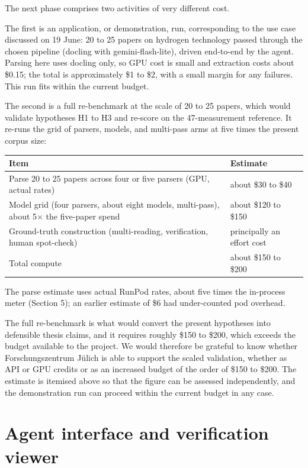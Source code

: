 The next phase comprises two activities of very different cost.

The first is an application, or demonstration, run, corresponding to the
use case discussed on 19 June: 20 to 25 papers on hydrogen technology
passed through the chosen pipeline (docling with gemini-flash-lite),
driven end-to-end by the agent. Parsing here uses docling only, so GPU
cost is small and extraction costs about \$0.15; the total is
approximately \$1 to \$2, with a small margin for any failures. This run
fits within the current budget.

The second is a full re-benchmark at the scale of 20 to 25 papers, which
would validate hypotheses H1 to H3 and re-score on the 47-measurement
reference. It re-runs the grid of parsers, models, and multi-pass arms
at five times the present corpus size:

\begin{longtable}[]{@{}L{0.70}L{0.20}@{}}
\toprule\noalign{}
Item & Estimate \\
\midrule\noalign{}
\endhead
\bottomrule\noalign{}
\endlastfoot
Parse 20 to 25 papers across four or five parsers (GPU, actual rates) &
about \$30 to \$40 \\
Model grid (four parsers, about eight models, multi-pass), about 5× the
five-paper spend & about \$120 to \$150 \\
Ground-truth construction (multi-reading, verification, human
spot-check) & principally an effort cost \\
Total compute & about \$150 to \$200 \\
\end{longtable}

The parse estimate uses actual RunPod rates, about five times the
in-process meter (Section 5); an earlier estimate of \$6 had
under-counted pod overhead.

The full re-benchmark is what would convert the present hypotheses into
defensible thesis claims, and it requires roughly \$150 to \$200, which
exceeds the budget available to the project. We would therefore be
grateful to know whether Forschungszentrum Jülich is able to support the
scaled validation, whether as API or GPU credits or as an increased
budget of the order of \$150 to \$200. The estimate is itemised above so
that the figure can be assessed independently, and the demonstration run
can proceed within the current budget in any case.

\section{Agent interface and verification
viewer}\label{agent-interface-and-verification-viewer}

